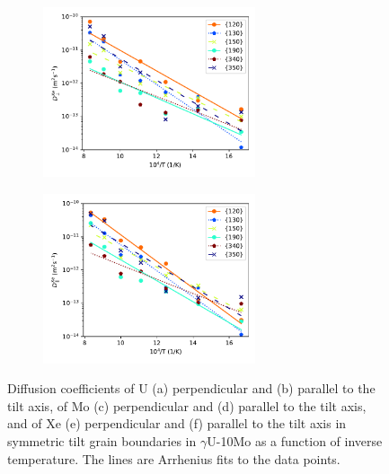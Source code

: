 \documentclass{elsarticle}
\begin{document}
\begin{figure}[!ht]
\begin{subfigure}{0.45\textwidth}
\end{subfigure}
\begin{subfigure}{0.45\textwidth}
	\centering
	\caption{}
	\includegraphics[height=5cm]{u10mo_Xe_Dx.pdf}
\end{subfigure}
\begin{subfigure}{0.45\textwidth}
	\centering
	\caption{}
	\includegraphics[height=5cm]{u10mo_Xe_Dz.pdf}
\end{subfigure}
\caption{Diffusion coefficients of U (a) perpendicular and (b) parallel to the tilt axis, of Mo (c) perpendicular and (d) parallel to the tilt axis, and of Xe (e) perpendicular and (f) parallel to the tilt axis in symmetric tilt grain boundaries in $\gamma$U-10Mo as a function of inverse temperature. The lines are Arrhenius fits to the data points.}
\label{fig:u10mo}
\end{figure}
\end{document}
